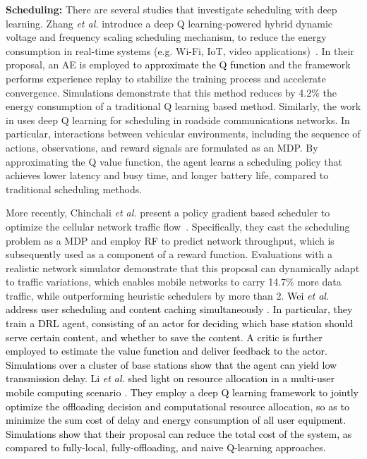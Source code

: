 \documentclass[journal,comsoc,letter]{IEEEtran}
\newcommand{\edit}[1]{\textcolor{black}{#1}}
\newcommand{\rev}[1]{\textcolor{black}{#1}}
\begin{document}
\noindent\textbf{Scheduling:} There are several studies that investigate scheduling with deep learning. Zhang \emph{et al.} introduce a deep Q learning-powered hybrid dynamic voltage and frequency scaling scheduling mechanism, to reduce the energy consumption in real-time systems (e.g. Wi-Fi, IoT, video applications)~\cite{zhang2017energy}. In their proposal, an AE is employed to \edit{approximate the Q function} and the framework performs experience replay \cite{schaul2015prioritized} to stabilize the training process and accelerate convergence. Simulations demonstrate that this method reduces by 4.2\% the energy consumption of a traditional Q learning based method. Similarly, the work in \cite{atallah2017deep} uses deep Q learning for scheduling in roadside communications networks. In particular, interactions between vehicular environments, including the sequence of actions, observations, and reward signals are formulated as an MDP. By approximating the Q value function, the agent learns a scheduling policy that achieves lower latency and busy time, and longer battery life, compared to traditional scheduling methods. 

More recently, Chinchali \emph{et al.} present a policy gradient based scheduler to optimize the cellular network traffic flow~\cite{chinchali2018}. Specifically, they cast the scheduling problem as a MDP and employ RF to predict network throughput, which is subsequently used as a component of a reward function. Evaluations with a realistic network simulator demonstrate that this proposal can dynamically adapt to traffic variations, which enables mobile networks to carry 14.7\% more data traffic, while outperforming heuristic schedulers by more than 2.  \edit{Wei \emph{et al.} address user scheduling and content caching simultaneously \cite{wei2018joint}. In particular, they train a DRL agent, consisting of an actor for deciding which base station should serve certain content, and whether to save the content. A critic is further employed to estimate the value function and deliver feedback to the actor. Simulations over a cluster of base stations show that the agent can yield low transmission delay.} \rev{Li \emph{et al.} shed light on resource allocation in a multi-user mobile computing scenario \cite{li2018deep}. They employ a deep Q learning framework to jointly optimize the offloading decision and computational resource  allocation, so as to minimize the sum cost of delay and energy consumption of all user equipment. Simulations show that their proposal can reduce the total cost of the system, as compared to fully-local, fully-offloading, and naive Q-learning approaches. }\\
\end{document}
